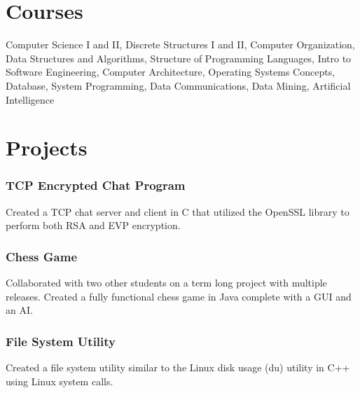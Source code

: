 \documentclass{article}
\begin{document}
	\section*{Courses}
		\begin{addmargin}[1em]{0em}
			Computer Science I and II, Discrete Structures I and II, Computer Organization, Data Structures and Algorithms, Structure of Programming Languages, Intro to Software Engineering, Computer Architecture, Operating Systems Concepts, Database, System Programming, Data Communications, Data Mining, Artificial Intelligence
		\end{addmargin}

	\section*{Projects}
		\subsubsection{TCP Encrypted Chat Program}
			\begin{addmargin}[1em]{0em}
				Created a TCP chat server and client in C that utilized the OpenSSL library to perform both RSA and EVP encryption.
			\end{addmargin}

		\subsubsection{Chess Game}
			\begin{addmargin}[1em]{0em}
				Collaborated with two other students on a term long project with multiple releases. Created a fully functional chess game in Java complete with a GUI and an AI.
			\end{addmargin}

		\subsubsection{File System Utility}
			\begin{addmargin}[1em]{0em}
				Created a file system utility similar to the Linux disk usage (du) utility in C++ using Linux system calls.
			\end{addmargin}

\end{document}
